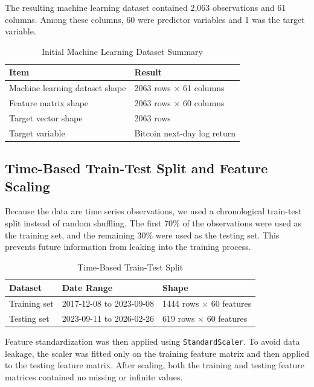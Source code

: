 \documentclass[12pt]{article}
\begin{document}
The resulting machine learning dataset contained 2,063 observations and 61 columns. Among these columns, 60 were predictor variables and 1 was the target variable.

\begin{table}[H]
\centering
\caption{Initial Machine Learning Dataset Summary}
\begin{tabular}{ll}
\toprule
\textbf{Item} & \textbf{Result} \\
\midrule
Machine learning dataset shape & 2063 rows $\times$ 61 columns \\
Feature matrix shape & 2063 rows $\times$ 60 columns \\
Target vector shape & 2063 rows \\
Target variable & Bitcoin next-day log return \\
\bottomrule
\end{tabular}
\end{table}

\subsection{Time-Based Train-Test Split and Feature Scaling}

Because the data are time series observations, we used a chronological train-test split instead of random shuffling. The first 70\% of the observations were used as the training set, and the remaining 30\% were used as the testing set. This prevents future information from leaking into the training process.

\begin{table}[H]
\centering
\caption{Time-Based Train-Test Split}
\begin{tabular}{lll}
\toprule
\textbf{Dataset} & \textbf{Date Range} & \textbf{Shape} \\
\midrule
Training set & 2017-12-08 to 2023-09-08 & 1444 rows $\times$ 60 features \\
Testing set & 2023-09-11 to 2026-02-26 & 619 rows $\times$ 60 features \\
\bottomrule
\end{tabular}
\end{table}

Feature standardization was then applied using \texttt{StandardScaler}. To avoid data leakage, the scaler was fitted only on the training feature matrix and then applied to the testing feature matrix. After scaling, both the training and testing feature matrices contained no missing or infinite values.
\end{document}
